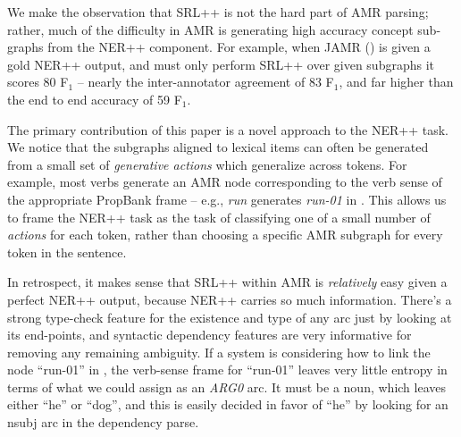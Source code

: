 \documentclass[11pt]{article}
\newcommand\w[1]{\textit{#1}} %
\newcommand\n[1]{\textit{#1}} %
\begin{document}
We make the observation that SRL++ is not the hard part of AMR parsing;
  rather, much of the difficulty in AMR is generating high accuracy concept
  sub-graphs from the NER++ component.
For example, when JAMR (\cite{2014flanigan-amr}) is given a gold NER++ output, and must only perform SRL++ 
  over given subgraphs it scores 80 F$_1$ -- nearly the inter-annotator agreement of 83 F$_1$, and far higher than the end to end accuracy of 59 F$_1$.

The primary contribution of this paper is a novel approach to the NER++ task. We notice that the subgraphs aligned to lexical items can often be generated from a small set of \textit{generative actions} which generalize across tokens. For example, most verbs generate an AMR node corresponding to the verb sense of the appropriate PropBank frame -- e.g., \w{run} generates \n{run-01} in . This allows us to frame the NER++ task as the task of classifying one of a small number of \textit{actions} for each token, rather than choosing a specific AMR subgraph for every token in the sentence.


In retrospect, it makes sense that SRL++ within AMR is \textit{relatively} easy given a perfect NER++ output, because NER++ carries so much information.
There's a strong type-check feature for the existence and type of any arc just by looking at its end-points, and syntactic dependency features are very informative for removing any remaining ambiguity.
If a system is considering how to link the node ``run-01'' in , the verb-sense frame for ``run-01'' leaves very little entropy in terms of what we could assign as an \w{ARG0} arc.
It must be a noun, which leaves either ``he'' or ``dog'', and this is easily decided in favor of ``he'' by looking for an nsubj arc in the dependency parse. 
\end{document}
